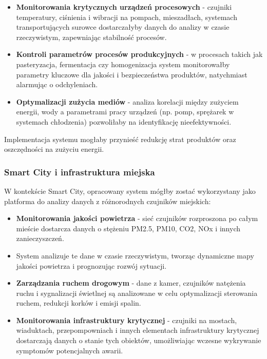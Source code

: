 \begin{itemize}
    \item \textbf{Monitorowania krytycznych urządzeń procesowych} - czujniki temperatury, ciśnienia i wibracji na pompach, mieszadłach, systemach transportujących surowce dostarczałyby danych do analizy w czasie rzeczywistym, zapewniając stabilność procesów.
    \item \textbf{Kontroli parametrów procesów produkcyjnych} - w procesach takich jak pasteryzacja, fermentacja czy homogenizacja system monitorowałby parametry kluczowe dla jakości i bezpieczeństwa produktów, natychmiast alarmując o odchyleniach.
    \item \textbf{Optymalizacji zużycia mediów} - analiza korelacji między zużyciem energii, wody a parametrami pracy urządzeń (np. pomp, sprężarek w systemach chłodzenia) pozwoliłaby na identyfikację nieefektywności.
\end{itemize}

Implementacja systemu mogłaby przynieść redukcję strat produktów oraz oszczędności na zużyciu energii.

\subsubsection{Smart City i infrastruktura miejska}
\label{subsubsec:smart_city}

W kontekście Smart City, opracowany system mógłby zostać wykorzystany jako platforma do analizy danych z różnorodnych czujników miejskich:

\begin{itemize}
    \item \textbf{Monitorowania jakości powietrza} - sieć czujników rozproszona po całym mieście dostarcza danych o stężeniu PM2.5, PM10, CO2, NOx i innych zanieczyszczeń.
    \item System analizuje te dane w czasie rzeczywistym, tworząc dynamiczne mapy jakości powietrza i prognozując rozwój sytuacji.
    \item \textbf{Zarządzania ruchem drogowym} - dane z kamer, czujników natężenia ruchu i sygnalizacji świetlnej są analizowane w celu optymalizacji sterowania ruchem, redukcji korków i emisji spalin.
    \item \textbf{Monitorowania infrastruktury krytycznej} - czujniki na mostach, wiaduktach, przepompowniach i innych elementach infrastruktury krytycznej dostarczają
    danych o stanie tych obiektów, umożliwiając wczesne wykrywanie symptomów potencjalnych awarii.
\end{itemize}

